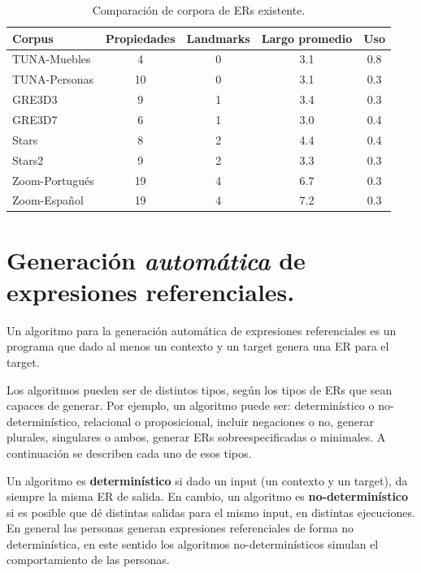 \begin{table}[ht]
\begin{center}
\footnotesize{

\begin{tabular} {  l c c c c}
\hline
Corpus											&Propiedades			  & Landmarks			& Largo promedio	& Uso \\
\hline
TUNA-Muebles							  & 4								& 0							&	3.1				& 0.8   \\
TUNA-Personas								& 10							& 0							& 3.1				& 0.3   \\
GRE3D3											&	9								& 1							& 3.4				& 0.3   \\
GRE3D7											&	6								& 1							& 3.0				& 0.4   \\
Stars												&	8								& 2							& 4.4				& 0.4   \\
Stars2											& 9								& 2							& 3.3				& 0.3   \\
Zoom-Portugu\'es						& 19							& 4							& 6.7				& 0.3   \\
Zoom-Espa\~nol							& 19							& 4							& 7.2				& 0.3   \\
\hline
\end{tabular}
}
\end{center}
\caption{Comparaci\'on de corpora de ERs existente.}\label{tab-comparison-prop}
\end{table}

\section{Generaci\'on \emph{autom\'atica} de expresiones referenciales.}
\label{sec:tipos_algoritmos}

Un algoritmo para la generaci\'on autom\'atica de expresiones referenciales es un programa que dado al menos un contexto y un target genera una ER para el target.

Los algoritmos pueden ser de distintos tipos, seg\'un los tipos de ERs que sean capaces de generar. Por ejemplo, un algoritmo puede ser: determin\'{i}stico o no-determin\'{i}stico, relacional o proposicional, incluir negaciones o no, generar plurales, singulares o ambos, generar ERs sobreespecificadas o minimales. A continuaci\'on se describen cada uno de esos tipos.

Un algoritmo es {\bf determin\'{i}stico} si dado un input (un contexto y un target), da siempre la misma ER de salida. En cambio, un algoritmo es {\bf no-determin\'{i}stico} si es posible que d\'e distintas salidas para el mismo input, en distintas ejecuciones. En general las personas generan expresiones referenciales de forma no determin\'istica, en este sentido los algoritmos no-determin\'isticos simulan el comportamiento de las personas. 

